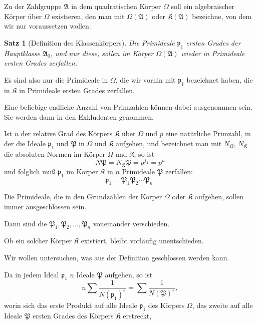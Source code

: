 \documentclass[12pt,a4paper]{article}
\newtheorem*{satz}{Satz}
\begin{document}
Zu der Zahlgruppe $\mathfrak{A}$ in dem quadratischen K\"orper $\Omega$ soll ein algebraischer K\"orper \"uber $\Omega$ existieren, den man mit $\Omega(\mathfrak{A})$ oder $\mathfrak{K}(\mathfrak{A})$ bezeichne, von dem wir nur voraussetzen wollen:

\begin{satz}[Definition des Klassenk\"orpers]
Die Primideale $\mathfrak{p}_1$ ersten Grades der Hauptklasse $\mathfrak{A}_0$, und nur diese, sollen im K\"orper $\Omega(\mathfrak{A})$ wieder in Primideale ersten Grades zerfallen.
\end{satz}

Es sind also nur die Primideale in $\Omega$, die wir vorhin mit $\mathfrak{p}_1$ bezeichnet haben, die in $\mathfrak{K}$ in Primideale ersten Grades zerfallen.

Eine beliebige endliche Anzahl von Primzahlen k\"onnen dabei ausgenommen sein. Sie werden dann in den Exkludenten genommen.

Ist $n$ der relative Grad des K\"orpers $\mathfrak{K}$ \"uber $\Omega$ und $p$ eine nat\"urliche Primzahl, in der die Ideale $\mathfrak{p}_1$ und $\mathfrak{P}$ in $\Omega$ und $\mathfrak{K}$ aufgehen, und bezeichnet man mit $N_\Omega$, $N_\mathfrak{K}$ die absoluten Normen im K\"orper $\Omega$ und $\mathfrak{K}$, so ist
\[N\mathfrak{P} = N_\mathfrak{K}\mathfrak{P} = p^{f_1} = p^n\]
und folglich mu\ss{} $\mathfrak{p}_1$ im K\"orper $\mathfrak{K}$ in $n$ Primideale $\mathfrak{P}$ zerfallen:
\begin{equation}\mathfrak{p}_1 = \mathfrak{P}_1 \mathfrak{P}_2 \cdots \mathfrak{P}_n.\end{equation}

Die Primideale, die in den Grundzahlen der K\"orper $\Omega$ oder $\mathfrak{K}$ aufgehen, sollen immer ausgeschlossen sein.

Dann sind die $\mathfrak{P}_1, \mathfrak{P}_2, \ldots, \mathfrak{P}_n$ voneinander verschieden.

Ob ein solcher K\"orper $\mathfrak{K}$ existiert, bleibt vorl\"aufig unentschieden.

Wir wollen untersuchen, was aus der Definition geschlossen werden kann.

Da in jedem Ideal $\mathfrak{p}_1$ $n$ Ideale $\mathfrak{P}$ aufgehen, so ist
\begin{equation}n \sum \frac{1}{N(\mathfrak{p}_1)^s} = \sum \frac{1}{N(\mathfrak{P})^s},\end{equation}
worin sich das erste Produkt auf alle Ideale $\mathfrak{p}_1$ des K\"orpers $\Omega$, das zweite auf alle Ideale $\mathfrak{P}$ ersten Grades des K\"orpers $\mathfrak{K}$ erstreckt,
\end{document}
